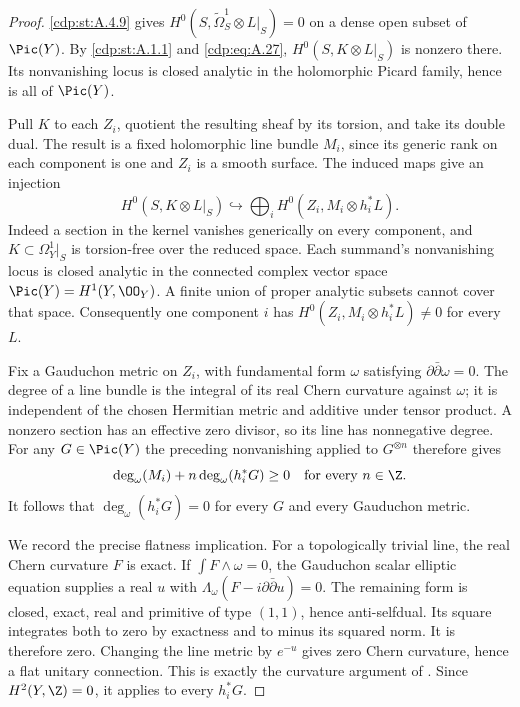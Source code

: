 \begin{proof}
\ref{cdp:st:A.4.9} gives $H^0(S,\widetilde\Omega_S^1\otimes L|_S)=0$ on a dense open subset of $\Pic(Y)$. By \ref{cdp:st:A.1.1} and \eqref{cdp:eq:A.27}, $H^0(S,K\otimes L|_S)$ is nonzero there. Its nonvanishing locus is closed analytic in the holomorphic Picard family, hence is all of $\Pic(Y)$.

Pull $K$ to each $Z_i$, quotient the resulting sheaf by its torsion, and take its double dual. The result is a fixed holomorphic line bundle $M_i$, since its generic rank on each component is one and $Z_i$ is a smooth surface. The induced maps give an injection
\[
 H^0(S,K\otimes L|_S)\hookrightarrow
       \bigoplus_i H^0(Z_i,M_i\otimes h_i^*L).
 \tag{A.29}\label{cdp:eq:A.29}
\]
Indeed a section in the kernel vanishes generically on every component, and $K\subset\Omega_Y^1|_S$ is torsion-free over the reduced space. Each summand's nonvanishing locus is closed analytic in the connected complex vector space $\Pic(Y)=H^1(Y,\OO_Y)$. A finite union of proper analytic subsets cannot cover that space. Consequently one component $i$ has
$H^0(Z_i,M_i\otimes h_i^*L)\ne0$ for every $L$.

Fix a Gauduchon metric on $Z_i$, with fundamental form $\omega$ satisfying $\partial\bar\partial\omega=0$. The degree of a line bundle is the integral of its real Chern curvature against $\omega$; it is independent of the chosen Hermitian metric and additive under tensor product. A nonzero section has an effective zero divisor, so its line has nonnegative degree. For any $G\in\Pic(Y)$ the preceding nonvanishing applied to $G^{\otimes n}$ therefore gives
\[
 \deg_\omega(M_i)+n\deg_\omega(h_i^*G)\ge0
 \quad\hbox{for every }n\in\Z.
\]
It follows that $\deg_\omega(h_i^*G)=0$ for every $G$ and every Gauduchon metric.

We record the precise flatness implication. For a topologically trivial line, the real Chern curvature $F$ is exact. If $\int F\wedge\omega=0$, the Gauduchon scalar elliptic equation supplies a real $u$ with $\Lambda_\omega(F-i\partial\bar\partial u)=0$. The remaining form is closed, exact, real and primitive of type $(1,1)$, hence anti-selfdual. Its square integrates both to zero by exactness and to minus its squared norm. It is therefore zero. Changing the line metric by $e^{-u}$ gives zero Chern curvature, hence a flat unitary connection. This is exactly the curvature argument of \cite[Lemma~2.3(1)--(2)]{Teleman2006}. Since $H^2(Y,\Z)=0$, it applies to every $h_i^*G$.


\end{proof}
